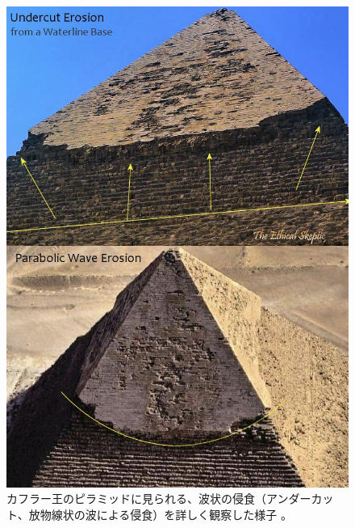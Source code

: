 \documentclass[10pt,twocolumn,letterpaper]{article}
\begin{document}


\begin{figure}[H]
\begin{center}
   \includegraphics[width=1\linewidth]{wave.jpg}
\end{center}
   \caption{カフラー王のピラミッドに見られる、波状の侵食（アンダーカット、放物線状の波による侵食）を詳しく観察した様子 \cite{27}。}
\label{fig:19}
\label{fig:onecol}
\end{figure}
\end{document}
